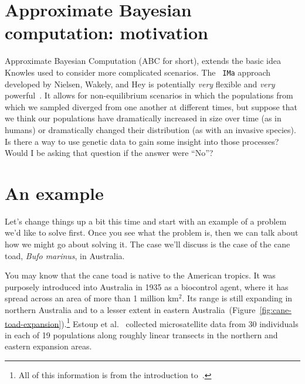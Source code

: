 \documentclass[12pt]{article}
\begin{document}
\section*{Approximate Bayesian computation: motivation}

Approximate Bayesian Computation (ABC for short), extends the basic
idea Knowles used to consider more complicated scenarios. The {\tt
  IMa} approach developed by Nielsen, Wakely, and Hey is potentially
{\it very\/} flexible and {\it very\/}
powerful~\cite{Hey-Nielsen-2004,Hey-Nielsen-2007,Nielsen-Wakeley-2001}. It
allows for non-equilibrium scenarios in which the populations from
which we sampled diverged from one another at different times, but
suppose that we think our populations have dramatically increased in
size over time (as in humans) or dramatically changed their
distribution (as with an invasive species). Is there a way to use
genetic data to gain some insight into those processes? Would I be
asking that question if the answer were ``No''?

\section*{An example}

Let's change things up a bit this time and start with an example of a
problem we'd like to solve first. Once you see what the problem is,
then we can talk about how we might go about solving it. The case
we'll discuss is the case of the cane toad, {\it Bufo marinus}, in
Australia.

You may know that the cane toad is native to the American tropics. It
was purposely introduced into Australia in 1935 as a biocontrol agent,
where it has spread across an area of more than 1 million km$^2$. Its
range is still expanding in northern Australia and to a lesser extent
in eastern
Australia~(Figure~\ref{fig:cane-toad-expansion}).\footnote{All of this
  information is from the introduction to~\cite{Estoup-etal-2004}.}
Estoup et al.~\cite{Estoup-etal-2004} collected microsatellite data
from 30 individuals in each of 19 populations along roughly linear
transects in the northern and eastern expansion areas.
\end{document}
